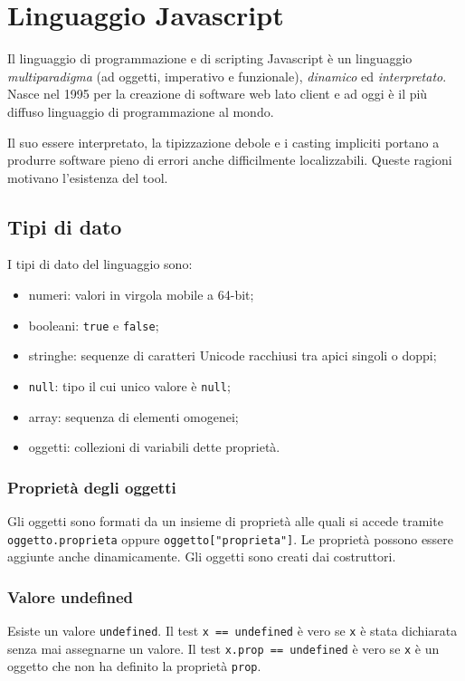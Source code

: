 \chapter{Linguaggio Javascript}

Il linguaggio di programmazione e di scripting Javascript è un linguaggio \emph{multiparadigma} (ad oggetti, imperativo e funzionale), \emph{dinamico} ed \emph{interpretato}. Nasce nel 1995 per la creazione di software web lato client e ad oggi è il più diffuso linguaggio di programmazione al mondo.

Il suo essere interpretato, la tipizzazione debole e i casting impliciti portano a produrre software pieno di errori anche difficilmente localizzabili. Queste ragioni motivano l'esistenza del tool. 

\section{Tipi di dato}

I tipi di dato del linguaggio sono:
\begin{itemize}
    \item numeri: valori in virgola mobile a 64-bit;
    \item booleani: \texttt{true} e \texttt{false};
    \item stringhe: sequenze di caratteri Unicode racchiusi tra apici singoli o doppi;
    \item \texttt{null}: tipo il cui unico valore è \texttt{null};
    \item array: sequenza di elementi omogenei;
    \item oggetti: collezioni di variabili dette proprietà.
\end{itemize}

\subsection{Proprietà degli oggetti}

Gli oggetti sono formati da un insieme di proprietà alle quali si accede tramite \texttt{oggetto.proprieta} oppure \texttt{oggetto["proprieta"]}. Le proprietà possono essere aggiunte anche dinamicamente. Gli oggetti sono creati dai costruttori.

\subsection{Valore undefined}

Esiste un valore \texttt{undefined}. Il test \texttt{x == undefined} è vero se \texttt{x} è stata dichiarata senza mai assegnarne un valore. Il test \texttt{x.prop == undefined} è vero se \texttt{x} è un oggetto che non ha definito la proprietà \texttt{prop}.

